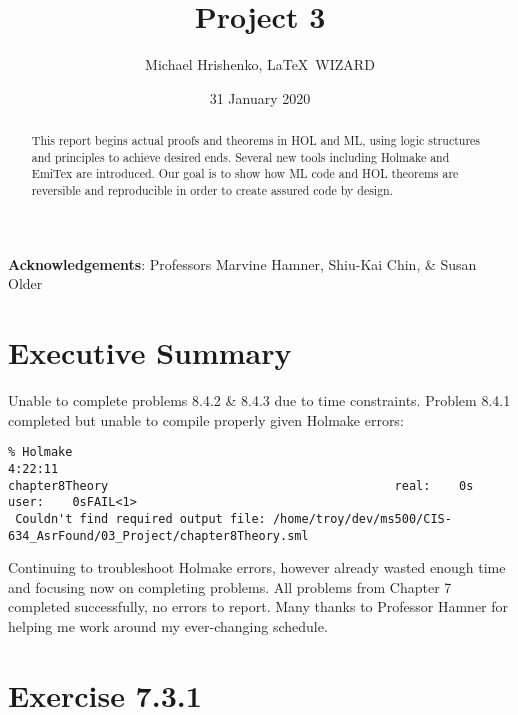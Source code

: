 \documentclass[twoside]{report}
\title{Project 3}
\date{31 January 2020}
\author{Michael Hrishenko, \LaTeX\ WIZARD}
\begin{document}
\lstset{language=ML}
\maketitle
\begin{abstract}
This report begins actual proofs and theorems in HOL and ML, using logic structures and principles to achieve desired ends. Several new tools including Holmake and EmiTex are introduced. Our goal is to show how ML code and HOL theorems are reversible and reproducible in order to create assured code by design.
\end{abstract}

\textbf{Acknowledgements}: Professors Marvine Hamner, Shiu-Kai Chin, \& Susan Older

\tableofcontents

\chapter{Executive Summary}
\label{cha:executive-summary}
Unable to complete problems 8.4.2 \& 8.4.3 due to time constraints. Problem 8.4.1 completed but unable to compile properly given Holmake errors:
\begin{scriptsize}
    \begin{verbatim}
% Holmake                                                                     4:22:11
chapter8Theory                                        real:    0s  user:    0sFAIL<1>
 Couldn't find required output file: /home/troy/dev/ms500/CIS-634_AsrFound/03_Project/chapter8Theory.sml
     \end{verbatim}
\end{scriptsize}
Continuing to troubleshoot Holmake errors, however already wasted enough time and focusing now on completing problems. All problems from Chapter 7 completed successfully, no errors to report. Many thanks to Professor Hamner for helping me work around my ever-changing schedule.


\chapter{Exercise 7.3.1}
\label{cha:7-3-1}
\end{document}
